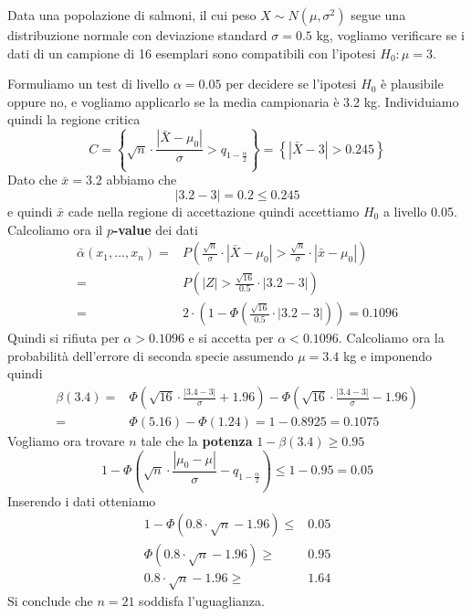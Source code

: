 \begin{example}
	Data una popolazione di salmoni, il cui peso $X \sim N(\mu, \sigma^2)$ segue una distribuzione
	normale con deviazione standard $\sigma = 0.5$ kg, vogliamo verificare se i dati di un campione
	di 16 esemplari sono compatibili con l'ipotesi $H_0 : \mu = 3$.

	Formuliamo un test di livello $\alpha = 0.05$ per decidere se l'ipotesi $H_0$ è plausibile
	oppure no, e vogliamo applicarlo se la media campionaria è 3.2 kg. Individuiamo quindi la
	regione critica
	\[
		C = \left\{ \sqrt{n} \cdot
		\frac{|\bar{X} - \mu_0|}{\sigma} > q_{1-\frac{\alpha}{2}} \right\} =
		\left\{ |\bar{X}-3| > 0.245 \right\}
	\]
	Dato che $\bar{x} = 3.2$ abbiamo che
	\[ |3.2 - 3| = 0.2 \leq 0.245 \]
	e quindi $\bar{x}$ cade nella regione di accettazione quindi accettiamo $H_0$ a livello 0.05.
	Calcoliamo ora il \textbf{$p$-value} dei dati
	\begin{align*}
		\bar{\alpha} (x_1, \dots, x_n) = &
		P \left( \frac{\sqrt{n}}{\sigma} \cdot |\bar{X} - \mu_0| >
		\frac{\sqrt{n}}{\sigma} \cdot |\bar{x} - \mu_0| \right)      \\
		=                                &
		P \left( |Z| > \frac{\sqrt{16}}{0.5} \cdot |3.2 - 3| \right) \\
		=                                &
		2 \cdot \left( 1 - \Phi \left( \frac{\sqrt{16}}{0.5} \cdot
			|3.2 - 3| \right) \right) = 0.1096
	\end{align*}
	Quindi si rifiuta per $\alpha > 0.1096$ e si accetta per $\alpha < 0.1096$. Calcoliamo ora la
	probabilità dell'errore di seconda specie assumendo $\mu = 3.4$ kg e imponendo quindi
	\begin{align*}
		\beta(3.4) = & \Phi \left( \sqrt{16} \cdot \frac{|3.4 - 3|}{\sigma} + 1.96 \right) -
		\Phi \left( \sqrt{16} \cdot \frac{|3.4 - 3|}{\sigma} - 1.96 \right)                  \\
		=            & \Phi(5.16) - \Phi(1.24) = 1 - 0.8925 = 0.1075
	\end{align*}
	Vogliamo ora trovare $n$ tale che la \textbf{potenza} $1 - \beta(3.4) \geq 0.95$
	\[
		1 - \Phi \left( \sqrt{n} \cdot \frac{|\mu_0 - \mu|}{\sigma}
		- q_{1 - \frac{\alpha}{2}} \right) \leq 1 - 0.95 = 0.05
	\]
	Inserendo i dati otteniamo
	\begin{align*}
		1 - \Phi \left( 0.8 \cdot \sqrt{n} - 1.96 \right) \leq & 0.05 \\
		\Phi \left( 0.8 \cdot \sqrt{n} - 1.96 \right) \geq     & 0.95 \\
		0.8 \cdot \sqrt{n} - 1.96 \geq                         & 1.64
	\end{align*}
	Si conclude che $n = 21$ soddisfa l'uguaglianza.
\end{example}

